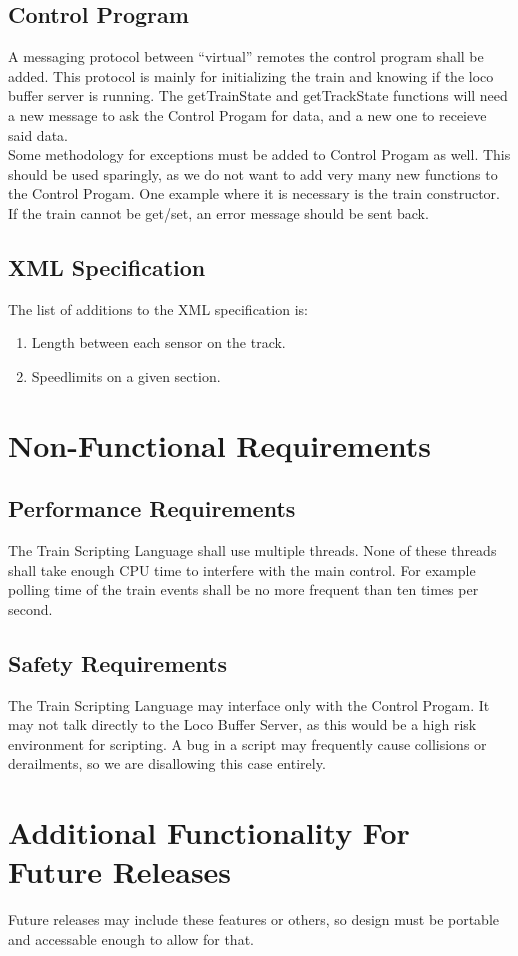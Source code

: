 \documentclass[a4paper,11pt,notitlepage]{article}
\def\TSL{Train Scripting Language\xspace}
\def\CS{Control Progam\xspace}
\begin{document}
\subsection{Control Program}
    A messaging protocol between ``virtual'' remotes the control program shall be added.  This protocol is mainly for initializing the train and knowing if the loco buffer server is running. The getTrainState and getTrackState functions will need a new message to ask the \CS for data, and a new one to receieve said data.
    \\Some methodology for exceptions must be added to \CS as well. This should be used sparingly, as we do not want to add very many new functions to the \CS. One example where it is necessary is the train constructor. If the train cannot be get/set, an error message should be sent back.
\subsection{XML Specification}
    The list of additions to the XML specification is:
\begin{enumerate}
    \item Length between each sensor on the track.
    \item Speedlimits on a given section.
\end{enumerate}

\newpage
\section{Non-Functional Requirements}
\subsection{Performance Requirements}
The \TSL shall use multiple threads. None of these threads shall take enough CPU time to interfere with the main control. For example polling time of the train events shall be no more frequent than ten times per second.

\subsection{Safety Requirements}
The \TSL may interface only with the \CS. It may not talk directly to the Loco Buffer Server, as this would be a high risk environment for scripting. A bug in a script may frequently cause collisions or derailments, so we are disallowing this case entirely.

\newpage
\section{Additional Functionality For Future Releases}
Future releases may include these features or others, so design must be portable and accessable enough to allow for that.
\end{document}
